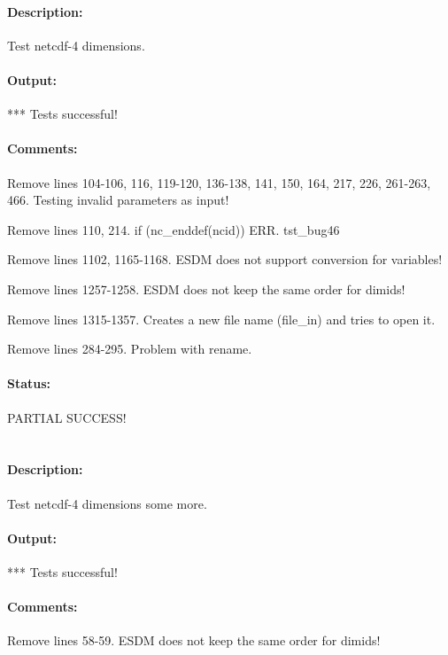 \paragraph{Description:} Test netcdf-4 dimensions.

\paragraph{Output:} *** Tests successful!

\paragraph{Comments:} Remove lines 104-106, 116, 119-120, 136-138, 141, 150, 164, 217, 226, 261-263, 466. Testing invalid parameters as input!

Remove lines 110, 214. if (nc\_enddef(ncid)) ERR. tst\_bug46

Remove lines 1102, 1165-1168. ESDM does not support conversion for variables!

Remove lines 1257-1258. ESDM does not keep the same order for dimids!

Remove lines 1315-1357. Creates a new file name (file\_in) and tries to open it.

Remove lines 284-295. Problem with rename.

\paragraph{Status:} PARTIAL SUCCESS!

\section{}

\paragraph{Description:} Test netcdf-4 dimensions some more.

\paragraph{Output:} *** Tests successful!

\paragraph{Comments:} Remove lines 58-59. ESDM does not keep the same order for dimids!

